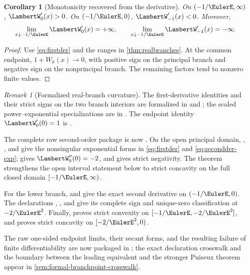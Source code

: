 \documentclass[11pt]{article}
\newtheorem{corollary}[corollary]{Corollary}
\theoremstyle{remark}
\newtheorem{remark}[remark]{Remark}
\newcommand{\Wz}{\LambertW_{0}}
\newcommand{\Wm}{\LambertW_{-1}}
\begin{document}
\begin{corollary}[Monotonicity recovered from the derivative]
On \((-1/\EulerE,\infty)\), \(\Wz'(x)>0\).  On
\((-1/\EulerE,0)\), \(\Wm'(x)<0\).  Moreover,
\[
 \lim_{x\downarrow-1/\EulerE}\Wz'(x)=+\infty,\qquad
 \lim_{x\downarrow-1/\EulerE}\Wm'(x)=-\infty.
\]
\end{corollary}

\begin{proof}
Use \eqref{eq:firstder} and the ranges in
\cref{thm:realbranches}.  At the common endpoint, \(1+W_k(x)\to0\), with
positive sign on the principal branch and negative sign on the
nonprincipal branch.  The remaining factors tend to nonzero finite values.
\end{proof}

\begin{remark}[Formalized real-branch curvature]
The first-derivative identities and their strict signs on the two branch
interiors are formalized in  and
; the scaled power--exponential specializations are
in .  The endpoint identity
\(\Wz'(0)=1\) is .

The complete raw second-order package is now
.  On the open principal domain,
,
, and
 give the nonsingular exponential forms
in \eqref{eq:firstder} and \eqref{eq:secondder-exp};
 gives \(\Wz''(0)=-2\), and
 gives strict negativity.
The theorem  strengthens the open
interval statement below to strict concavity on the full closed domain
\([-1/\EulerE,\infty)\).

For the lower branch,  and
 give the exact second derivative on
\((-1/\EulerE,0)\).  The declarations
,
, and
 give its complete sign and
unique-zero classification at \(-2/\EulerE^2\).  Finally,
 proves strict convexity on
\([-1/\EulerE,-2/\EulerE^2]\), and
 proves strict concavity on
\([-2/\EulerE^2,0)\).

The raw one-sided endpoint limits, their secant forms, and the resulting
failure of finite differentiability are now packaged in
; the exact declaration crosswalk and
the boundary between the leading equivalent and the stronger Puiseux theorem
appear in \cref{rem:formal-branchpoint-crosswalk}.
\end{remark}
\end{document}
